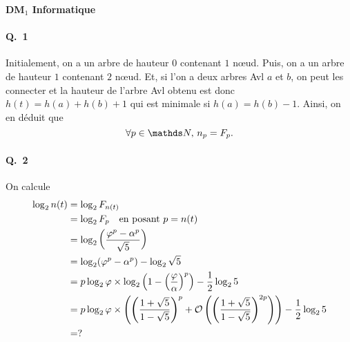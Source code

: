 \documentclass[a4paper]{article}
\begin{document}
	\begin{center}
		\Huge \bfseries DM$_1$ Informatique
	\end{center}

	\paragraph{Q.\ 1}
	Initialement, on a un arbre de hauteur $0$\/ contenant $1$\/ nœud.
	Puis, on a un arbre de hauteur $1$\/ contenant $2$\/ nœud.
	Et, si l'on a deux arbres {\sc Avl} $a$\/ et $b$, on peut les connecter et la hauteur de l'arbre {\sc Avl}\/ obtenu est donc $h(t) = h(a) + h(b) + 1$\/ qui est minimale si $h(a) = h(b) - 1$.
	Ainsi, on en déduit que \[
		\forall p \in \N,\,n_p = F_p
	.\]

	\paragraph{Q.\ 2}
	On calcule
	\begin{align*}
		\log_2 n(t) &= \log_2 F_{n(t)} \\
		&= \log_2 F_p \quad\text{en posant } p = n(t) \\
		&= \log_2 \left( \frac{\varphi^p-\alpha^p}{\sqrt{5}} \right) \\
		&= \log_2 (\varphi^p - \alpha^p) - \log_2 \sqrt{5} \\
		&= p \log_2 \varphi \times \log_2 \left( 1 - \left(\frac{\varphi}{\alpha}\right)^p \right) - \frac{1}{2} \log_2 5 \\
		&= p \log_2 \varphi \times \left(\left(\frac{1 + \sqrt{5}}{1 - \sqrt{5}}\right)^p + \operatorname*{\mathcal{O}}\left( \left(\frac{1 + \sqrt{5}}{1 - \sqrt{5}}\right)^{2p} \right) \right) - \frac{1}{2} \log_2 5 \\
		&= ? \\
	\end{align*}
\end{document}
